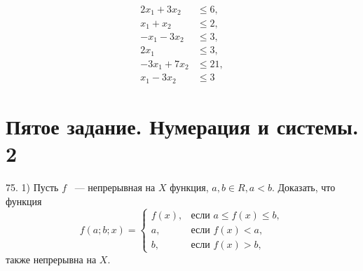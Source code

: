 \documentclass[a4paper,12pt]{article} %
\begin{document}
\begin{align} %
	2x_1 + 3x_2 & \leqslant 6, \\
	x_1 + x_2 & \leqslant 2, \\
	-x_1 - 3x_2 & \leqslant 3, \\
	2x_1 & \leqslant 3, \\
	-3x_1 + 7x_2 & \leqslant 21, \\
	x_1 - 3x_2 & \leqslant 3
\end{align}
	
	\newpage
	\section{Пятое задание. Нумерация и системы. 2}
	75. 1) Пусть $f$ ~--- непрерывная на $X$ функция, $a, b \in R, a < b.$ Доказать, что функция
	\[
		f(a;b;x)=\begin{cases}
			f \left(x \right), &\text{если } a \leqslant f \left(x \right) \leqslant b, \\
		a, &\text{если } f \left(x \right) < a, \\
		b, &\text{если } f \left(x \right) > b,
		\end{cases}
	\]
	также непрерывна на $X.$
	
	\newpage
\end{document}
